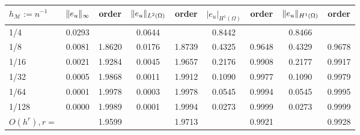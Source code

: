 \begin{tabular}{lcccccccc}
    \hline
    $h_\mathcal{M}:=n^{-1}$ & $\lVert e_u\rVert_\infty$ & order & 
    $\lVert e_u\rVert_{L^2(\Omega)}$ & order & $|e_u|_{H^1(\Omega)}$ & order &
    $\lVert e_u\rVert_{H^1(\Omega)}$ & order \Tstrut\Bstrut \\
    \hline
      1/4    &0.0293    &          &0.0644    &          &0.8442    &          &0.8466    &      \Tstrut\\
      1/8    &0.0081    &1.8620    &0.0176    &1.8739    &0.4325    &0.9648    &0.4329    &0.9678\\
     1/16    &0.0021    &1.9284    &0.0045    &1.9657    &0.2176    &0.9908    &0.2177    &0.9917\\
     1/32    &0.0005    &1.9868    &0.0011    &1.9912    &0.1090    &0.9977    &0.1090    &0.9979\\
     1/64    &0.0001    &1.9978    &0.0003    &1.9978    &0.0545    &0.9994    &0.0545    &0.9995\\
    1/128    &0.0000    &1.9989    &0.0001    &1.9994    &0.0273    &0.9999    &0.0273    &0.9999\Bstrut\\ \hline\Tstrut
$O(h^r),r=$  &          &1.9599    &          &1.9713    &          &0.9921    &          &0.9928\Bstrut\\
    \hline
\end{tabular}
